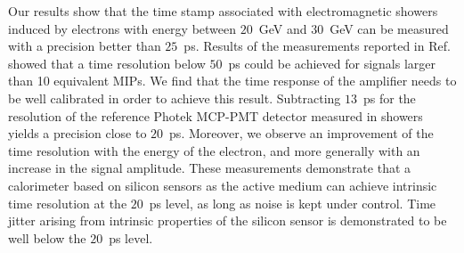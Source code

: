 \documentclass[preprint,1p]{elsarticle}
\begin{document}

Our results show that the time stamp associated with electromagnetic showers
induced by electrons with energy between $20$~GeV and $30$~GeV can be measured
with a precision better than $25$~ps. Results of the  measurements reported
in Ref.~\cite{akchurin} showed that a time resolution below $50$~ps could be
achieved for signals larger than 10 equivalent MIPs. We find that the time
response of the amplifier needs to be well calibrated in order to achieve this
result. Subtracting $13$~ps for the resolution of the reference Photek MCP-PMT
detector measured in showers~\cite{Ronzhin2015288} yields a precision close to
$20$~ps. Moreover, we observe an improvement of the time resolution with the
energy of the electron, and more generally with an increase in the signal
amplitude. These measurements demonstrate that a calorimeter based on silicon
sensors as the active medium can achieve intrinsic time resolution at the
$20$~ps level, as long as noise is kept under control. Time jitter arising from
intrinsic properties of the silicon sensor is demonstrated to be well below the
$20$~ps level.
\end{document}
